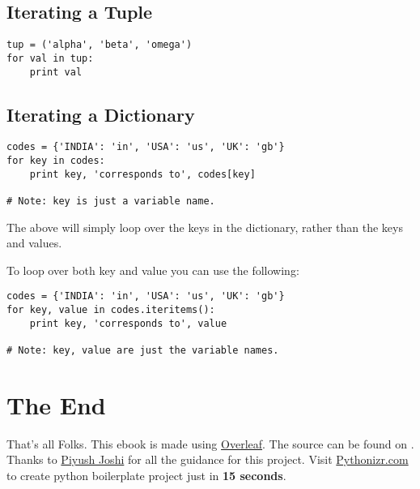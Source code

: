 \documentclass[a4paper,9pt]{extarticle}
\begin{document}
\begin{multicols*}{2}
\subsection{Iterating a Tuple}
\begin{lstlisting}
tup = ('alpha', 'beta', 'omega')
for val in tup:
    print val
\end{lstlisting}

\subsection{Iterating a Dictionary}
\begin{lstlisting}
codes = {'INDIA': 'in', 'USA': 'us', 'UK': 'gb'}
for key in codes:
    print key, 'corresponds to', codes[key]

# Note: key is just a variable name.
\end{lstlisting}
The above will simply loop over the keys in the dictionary, rather than the keys and values.

To loop over both key and value you can use the following:
\begin{lstlisting}
codes = {'INDIA': 'in', 'USA': 'us', 'UK': 'gb'}
for key, value in codes.iteritems():
    print key, 'corresponds to', value

# Note: key, value are just the variable names.
\end{lstlisting}

\section{The End}
That's all Folks.\newline
This ebook is made using \href{https://overleaf.com}{Overleaf}. \newline The source can be found on \href{https://github.com/akashp1712/python_cheat_sheets}{\LARGE{\faGithub}}. \newline
Thanks to \faLinkedin{} \href{https://www.linkedin.com/in/piyush-joshi-b7525216/}{Piyush Joshi} for all the guidance for this project. \newline
Visit \href{http://pythonizr.com}{Pythonizr.com} to create python boilerplate project just in \textbf{15 seconds}.

\end{multicols*}
\end{document}

